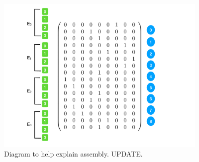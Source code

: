 \begin{figure}[htb]
\centering
\includegraphics[width=4in]{img/Assembly2.pdf}
\caption{Diagram to help explain assembly.  UPDATE.}
\label{multiregions:assembly2}
\end{figure}

